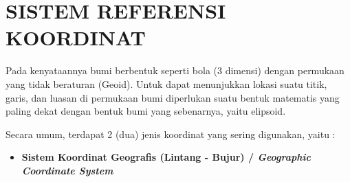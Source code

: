 \chapter{SISTEM REFERENSI KOORDINAT}

Pada kenyataannya bumi berbentuk seperti bola (3 dimensi) dengan permukaan yang tidak beraturan (Geoid). Untuk dapat menunjukkan lokasi suatu titik, garis, dan luasan di permukaan bumi diperlukan suatu bentuk matematis yang paling dekat dengan bentuk bumi yang sebenarnya, yaitu elipsoid.

Secara umum, terdapat 2 (dua) jenis koordinat yang sering digunakan, yaitu :

\begin{itemize}
  \item \textbf{Sistem Koordinat Geografis (Lintang - Bujur) / \textit{Geographic Coordinate System}}
\end{itemize}